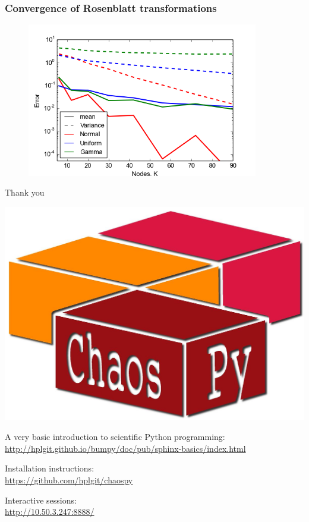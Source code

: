 \documentclass{beamer}
\begin{document}
 \begin{frame}
 \frametitle{Convergence of Rosenblatt transformations}
 \begin{figure}
 \includegraphics[width = 0.9\textwidth]{rosenblatt.png}
 \end{figure}

 \end{frame}

 
\begin{frame}[fragile]{Thank you}
  \begin{center}
     \includegraphics[width=.5\textwidth]{chaospy_logo.jpg}
  \end{center}
    \begin{alert}{A very basic introduction to scientific Python programming:}
    \scriptsize
      \href{http://hplgit.github.io/bumpy/doc/pub/sphinx-basics/index.html}{http://hplgit.github.io/bumpy/doc/pub/sphinx-basics/index.html}\\
  \end{alert}
  \begin{alert}{Installation instructions:}\\
  \scriptsize
      \href{https://github.com/hplgit/chaospy}{https://github.com/hplgit/chaospy}\\
  \end{alert}
    \begin{alert}{Interactive sessions:}\\
  \scriptsize
\href{http://10.50.3.247:8888/}{http://10.50.3.247:8888/}

  \end{alert}
\end{frame}
\end{document}
